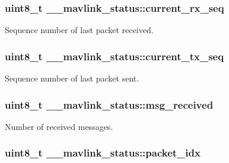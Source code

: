 \subsubsection[{\texorpdfstring{current\+\_\+rx\+\_\+seq}{current_rx_seq}}]{\setlength{\rightskip}{0pt plus 5cm}uint8\+\_\+t \+\_\+\+\_\+mavlink\+\_\+status\+::current\+\_\+rx\+\_\+seq}\hypertarget{struct____mavlink__status_affbdd32b3dff8ae35327a79ed6b17646}{}\label{struct____mavlink__status_affbdd32b3dff8ae35327a79ed6b17646}


Sequence number of last packet received. 

\subsubsection[{\texorpdfstring{current\+\_\+tx\+\_\+seq}{current_tx_seq}}]{\setlength{\rightskip}{0pt plus 5cm}uint8\+\_\+t \+\_\+\+\_\+mavlink\+\_\+status\+::current\+\_\+tx\+\_\+seq}\hypertarget{struct____mavlink__status_a06482d6c3fbfa829526c9b2e2e895f32}{}\label{struct____mavlink__status_a06482d6c3fbfa829526c9b2e2e895f32}


Sequence number of last packet sent. 

\subsubsection[{\texorpdfstring{msg\+\_\+received}{msg_received}}]{\setlength{\rightskip}{0pt plus 5cm}uint8\+\_\+t \+\_\+\+\_\+mavlink\+\_\+status\+::msg\+\_\+received}\hypertarget{struct____mavlink__status_a183576e45facc9da8123b7866d458680}{}\label{struct____mavlink__status_a183576e45facc9da8123b7866d458680}


Number of received messages. 

\subsubsection[{\texorpdfstring{packet\+\_\+idx}{packet_idx}}]{\setlength{\rightskip}{0pt plus 5cm}uint8\+\_\+t \+\_\+\+\_\+mavlink\+\_\+status\+::packet\+\_\+idx}\hypertarget{struct____mavlink__status_a3e582235849323267974003eb1793e25}{}\label{struct____mavlink__status_a3e582235849323267974003eb1793e25}


